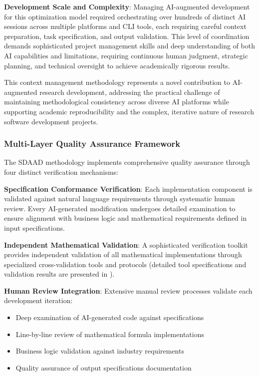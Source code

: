 \textbf{Development Scale and Complexity}: Managing AI-augmented development for this optimization model required orchestrating over hundreds of distinct AI sessions across multiple platforms and CLI tools, each requiring careful context preparation, task specification, and output validation. This level of coordination demands sophisticated project management skills and deep understanding of both AI capabilities and limitations, requiring continuous human judgment, strategic planning, and technical oversight to achieve academically rigorous results.

This context management methodology represents a novel contribution to AI-augmented research development, addressing the practical challenge of maintaining methodological consistency across diverse AI platforms while supporting academic reproducibility and the complex, iterative nature of research software development projects.

\subsubsection{Multi-Layer Quality Assurance Framework}

The SDAAD methodology implements comprehensive quality assurance through four distinct verification mechanisms:

\textbf{Specification Conformance Verification}: Each implementation component is validated against natural language requirements through systematic human review. Every AI-generated modification undergoes detailed examination to ensure alignment with business logic and mathematical requirements defined in input specifications.

\textbf{Independent Mathematical Validation}: A sophisticated verification toolkit provides independent validation of all mathematical implementations through specialized cross-validation tools and protocols (detailed tool specifications and validation results are presented in ).

\textbf{Human Review Integration}: Extensive manual review processes validate each development iteration:
\begin{itemize}
    \item Deep examination of AI-generated code against specifications
    \item Line-by-line review of mathematical formula implementations
    \item Business logic validation against industry requirements
    \item Quality assurance of output specifications documentation
\end{itemize}

